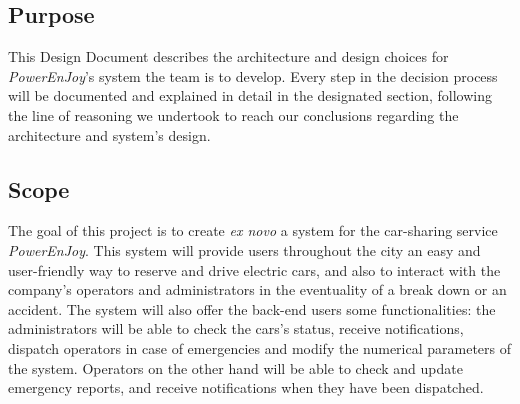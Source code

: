 \subsection{Purpose}
This Design Document describes the architecture and design choices for \textit{PowerEnJoy}'s system the team is to develop. Every step in the decision process will be documented and explained in detail in the designated section, following the line of reasoning we undertook to reach our conclusions regarding the architecture and system's design.

\subsection{Scope}
The goal of this project is to create \textit{ex novo} a system for the car-sharing service \textit{PowerEnJoy}. This system will provide users throughout the city an easy and user-friendly way to reserve and drive electric cars, and also to interact with the company's operators and administrators in the eventuality of a break down or an accident. 
The system will also offer the back-end users some functionalities: the administrators will be able to check the cars's status, receive notifications, dispatch operators in case of emergencies and modify the numerical parameters of the system. Operators on the other hand will be able to check and update emergency reports, and receive notifications when they have been dispatched.


